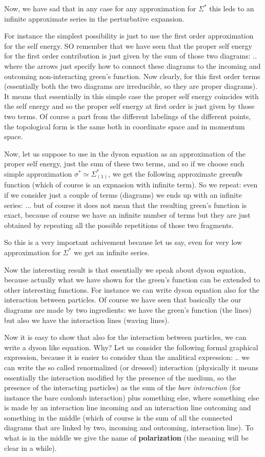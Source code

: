\documentclass[../main/main.tex]{subfiles}
\begin{document}
Now, we have sad that in any case for any approximation for \( \Sigma ^* \)
this leds to an infinite approximate series in the perturbative expansion.

For instance the simplest possibility is just to use the first order approximation for the  self energy. SO remember that we have seen that the proper self energy for the first order contribution is just given by the sum of those two diagrams:
..
where the arrows just specify how to connect these diagrams to the incoming and outcoming non-interacting green's function.
Now clearly, for this first order terms (essentially both the two diagrams are irreducible, so they are proper diagrams). It means that essentially in this simple case the proper self energy coincides with the self energy and so the proper self energy at first order is just given by those two terms.
Of course a part from the different labelings of the different points, the topological form is the same both in coordinate space and in momentum space.

Now, let us suppose to use in the dyson equation as an approximation of the proper self energy, just the sum of these two terms, and so if we choose such simple approximation \( \sigma ^* \simeq \Sigma ^*_{(1)} \), we get the following approximate green0s function (which of course is an expnasion with infinite term).
So we repeat: even if we consider just a couple of terms (diagrams) we ends up with an infinite series:
...
but of course it does not mean that the resulting green's function is exact, because of course we have an infinite number of terms but they are just obtained by repeating all the possible repetitions of those two fragments.

So this is a very important achivement because let us say, even for very low approximation for \( \Sigma ^* \) we get an infinite series.


Now the interesting result is that essentially we speak about dyson equation, because actually what we have shown for the green's function can be extended to other interesting functions. For instance we can write dyson equation also for the interaction between particles. Of course we have seen that basically the our diagrams are made by two ingredients: we have the green's function (the lines) but also we have the interaction lines (waving lines).

Now it is easy to show that also for the interaction between particles, we can write a dyson like equation. Why?
Let us consider the following formal graphical expression, because it is easier to consider than the analitical expression:
..
we can write the so called renormalized (or dressed) interaction (physically it means essentially the interaction modified by the presence of the medium, so the presence of the interacting particles) as the sum of the \emph{bare interaction} (for instance the bare coulomb interaction) plus something else, where something else is made by an interaction line incoming and an interaction line outcoming and something in the middle (which of course is the sum of all the connected diagrams that are linked by two, incoming and outcoming, interaction line). To what is in the middle we give the name of \textbf{polarization} (the meaning will be clear in a while).
\end{document}
